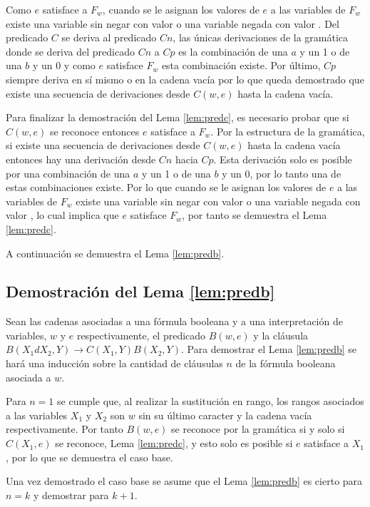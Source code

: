 Como $e$ satisface a $F_w$, cuando se le asignan los valores de $e$ a las variables de $F_w$ existe una variable 
sin negar con valor \true{} o una variable negada con valor \false{}. Del predicado $C$ se deriva al predicado 
$Cn$, las únicas derivaciones de la gramática donde se deriva del predicado $Cn$ a $Cp$ es la combinación de una 
$a$ y un 1 o de una $b$ y un 0 y como $e$ satisface $F_w$ esta combinación existe.  Por último, $Cp$ siempre deriva en sí mismo o en la cadena vacía por lo que queda demostrado que existe una secuencia de derivaciones desde $C(w,e)$ hasta la cadena vacía.

Para finalizar la demostración del Lema \ref{lem:predc}, es necesario probar que si $C(w,e)$ se reconoce entonces $e$ satisface a $F_w$. Por la estructura de la gramática, si existe una secuencia de derivaciones desde $C(w,e)$ hasta la cadena vacía entonces hay una derivación desde $Cn$ hacia $Cp$. Esta derivación solo es posible por una combinación de una $a$ y un 1 o de una $b$ y un 0, por lo tanto una de estas combinaciones existe. Por lo que cuando se le asignan los valores de $e$ a las variables de $F_w$ existe una variable 
sin negar con valor \true{} o una variable negada con valor \false{}, lo cual implica que $e$ satisface $F_w$, por tanto se demuestra el Lema \ref{lem:predc}.

A continuación se demuestra el Lema \ref{lem:predb}.

\subsection{Demostración del Lema \ref{lem:predb}}

Sean las cadenas asociadas a una fórmula booleana y a una interpretación de variables, $w$ y $e$
respectivamente, el predicado $B(w,e)$ y la cláusula $B(X_1dX_2,Y)\to C(X_1,Y) B(X_2,Y)$. Para demostrar el 
Lema \ref{lem:predb} se hará una inducción sobre la cantidad de cláusulas $n$ de la fórmula booleana asociada a 
$w$. 

Para $n=1$ se cumple que, al realizar la sustitución en rango, los rangos asociados a las variables $X_1$ y $X_2$ son $w$
sin su último caracter y la cadena vacía respectivamente. Por tanto $B(w,e)$ se reconoce por la gramática si 
y solo si $C(X_1,e)$ se reconoce, Lema \ref{lem:predc}, y esto solo es posible si $e$ satisface a $X_1$, por lo que se demuestra 
el caso base.

Una vez demostrado el caso base se asume que el Lema \ref{lem:predb} es cierto para $n=k$ y demostrar para $k+1$.

